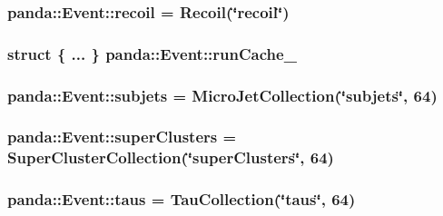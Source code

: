\label{classpanda_1_1Event_a860a1e91138f7c8763664d174f2d5e8c}
\hypertarget{classpanda_1_1Event_a8a6a46e16c3efe1f5a73d105228927f8}{
\subsubsection[{recoil}]{ {\bf panda::Event::recoil} = {\bf Recoil}(\char`\"{}recoil\char`\"{})}}
\label{classpanda_1_1Event_a8a6a46e16c3efe1f5a73d105228927f8}
\hypertarget{classpanda_1_1Event_a5ed40e8ab1d0bfcabb64fa24f4eebeb6}{
\subsubsection[{runCache\_\-}]{\setlength{\rightskip}{0pt plus 5cm}struct \{ ... \}   {\bf panda::Event::runCache\_\-}}}
\label{classpanda_1_1Event_a5ed40e8ab1d0bfcabb64fa24f4eebeb6}
\hypertarget{classpanda_1_1Event_a1e2ae9be493032383891406a863ef205}{
\subsubsection[{subjets}]{ {\bf panda::Event::subjets} = {\bf MicroJetCollection}(\char`\"{}subjets\char`\"{}, 64)}}
\label{classpanda_1_1Event_a1e2ae9be493032383891406a863ef205}
\hypertarget{classpanda_1_1Event_acb055eafe92e83b064dcbbba7140495f}{
\subsubsection[{superClusters}]{ {\bf panda::Event::superClusters} = {\bf SuperClusterCollection}(\char`\"{}superClusters\char`\"{}, 64)}}
\label{classpanda_1_1Event_acb055eafe92e83b064dcbbba7140495f}
\hypertarget{classpanda_1_1Event_a40e09c3f99a6e0207d60413940ae1876}{
\subsubsection[{taus}]{ {\bf panda::Event::taus} = {\bf TauCollection}(\char`\"{}taus\char`\"{}, 64)}}

